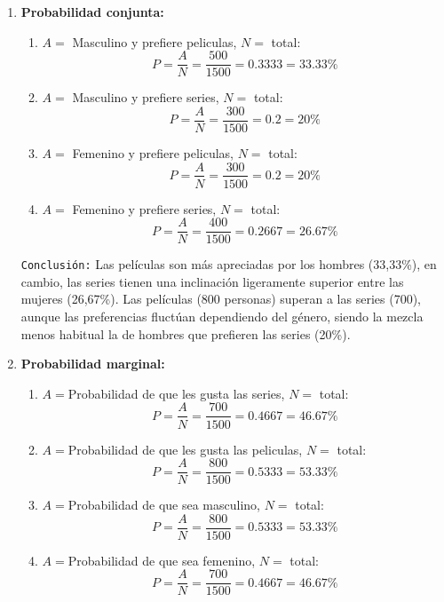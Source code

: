 \documentclass[12pt]{article}
\begin{document}
        \begin{enumerate}
            \item \textbf{Probabilidad conjunta:}
                \begin{enumerate}
                    \item $A = $ Masculino y prefiere peliculas, $N =$ total:
                        \[P = \frac{A}{N} = \frac{500}{1500} = 0.3333 = 33.33\%\]
                    \item $A = $ Masculino y prefiere series, $N =$ total:
                        \[P = \frac{A}{N} = \frac{300}{1500} = 0.2 = 20\%\]
                    \item $A = $ Femenino y prefiere peliculas, $N =$ total:
                        \[P = \frac{A}{N} = \frac{300}{1500} = 0.2 = 20\%\]
                    \item $A = $ Femenino y prefiere series, $N =$ total:
                        \[P = \frac{A}{N} = \frac{400}{1500} = 0.2667 = 26.67\%\]
                \end{enumerate}

                \texttt{Conclusión:} Las películas son más apreciadas por los hombres (33,33\%), en cambio, las series 
                tienen una inclinación ligeramente superior entre las mujeres (26,67\%). 
                Las películas (800 personas) superan a las series (700), aunque las preferencias fluctúan dependiendo del género, 
                siendo la mezcla menos habitual la de hombres que prefieren las series (20\%). 

            \item \textbf{Probabilidad marginal:}
                \begin{enumerate}
                    \item $A = $Probabilidad de que les gusta las series, $N =$ total:
                        \[P = \frac{A}{N} = \frac{700}{1500} = 0.4667 = 46.67\%\]
                    \item $A = $Probabilidad de que les gusta las peliculas, $N =$ total:
                        \[P = \frac{A}{N} = \frac{800}{1500} = 0.5333 = 53.33\%\]
                    \item $A = $Probabilidad de que sea masculino, $N =$ total:
                        \[P = \frac{A}{N} = \frac{800}{1500} = 0.5333 = 53.33\%\]
                    \item $A = $Probabilidad de que sea femenino, $N =$ total:
                        \[P = \frac{A}{N} = \frac{700}{1500} = 0.4667 = 46.67\%\]
                \end{enumerate}


\end{enumerate}
\end{document}
